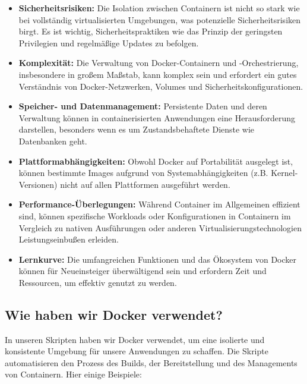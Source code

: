 \begin{itemize}
    \item \textbf{Sicherheitsrisiken:} Die Isolation zwischen Containern ist nicht so stark wie bei vollständig virtualisierten Umgebungen, was potenzielle Sicherheitsrisiken birgt. Es ist wichtig, Sicherheitspraktiken wie das Prinzip der geringsten Privilegien und regelmäßige Updates zu befolgen.
    \item \textbf{Komplexität:} Die Verwaltung von Docker-Containern und -Orchestrierung, insbesondere in großem Maßstab, kann komplex sein und erfordert ein gutes Verständnis von Docker-Netzwerken, Volumes und Sicherheitskonfigurationen.
    \item \textbf{Speicher- und Datenmanagement:} Persistente Daten und deren Verwaltung können in containerisierten Anwendungen eine Herausforderung darstellen, besonders wenn es um Zustandsbehaftete Dienste wie Datenbanken geht.
    \item \textbf{Plattformabhängigkeiten:} Obwohl Docker auf Portabilität ausgelegt ist, können bestimmte Images aufgrund von Systemabhängigkeiten (z.B. Kernel-Versionen) nicht auf allen Plattformen ausgeführt werden.
    \item \textbf{Performance-Überlegungen:} Während Container im Allgemeinen effizient sind, können spezifische Workloads oder Konfigurationen in Containern im Vergleich zu nativen Ausführungen oder anderen Virtualisierungstechnologien Leistungseinbußen erleiden.
    \item \textbf{Lernkurve:} Die umfangreichen Funktionen und das Ökosystem von Docker können für Neueinsteiger überwältigend sein und erfordern Zeit und Ressourcen, um effektiv genutzt zu werden.
\end{itemize}

\subsection{Wie haben wir Docker verwendet?}

In unseren Skripten haben wir Docker verwendet, um eine isolierte und konsistente Umgebung für unsere Anwendungen zu schaffen. Die Skripte automatisieren den Prozess des Builds, der Bereitstellung und des Managements von Containern. Hier einige Beispiele:

